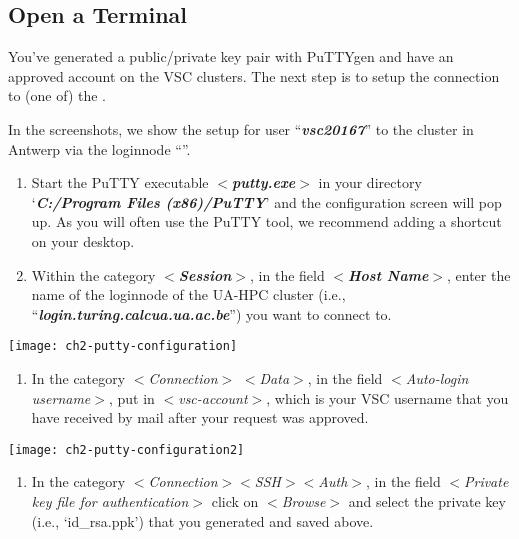   \subsection{Open a Terminal}
  \label{sec:windows-open-a-terminal}

  You've generated a public/private key pair with PuTTYgen and have an approved
  account on the VSC clusters.  The next step is to setup the connection to (one
  of) the \hpc.

  In the screenshots, we show the setup for user ``\textbf{\textit{vsc20167}}''
  to the \hpc cluster in Antwerp via the loginnode
  ``\textbf{\textit{\loginnode}}''.

  \begin{enumerate}
    \item  Start the PuTTY executable $<$\textbf{\textit{putty.exe}}$>$ in your
      directory `\textbf{\textit{C:/Program Files (x86)/PuTTY}}' and the
      configuration screen will pop up. As you will often use the PuTTY tool,
      we recommend adding a shortcut on your desktop.
    \item  Within the category $<$\textbf{\textit{Session}}$>$, in the field
      $<$\textbf{\textit{Host Name}}$>$, enter the name of the loginnode of the
      UA-HPC cluster (i.e., ``\textbf{\textit{login.turing.calcua.ua.ac.be}}'')
      you want to connect to.
  \end{enumerate}

  \texttt{[image: ch2-putty-configuration]}

  \begin{enumerate}
    \item  In the category $<$\textit{Connection}$>$ $<$\textit{Data}$>$, in
      the field $<$\textit{Auto-login username}$>$, put in
      $<$\textit{vsc-account}$>$, which is your VSC username that you have
      received by mail after your request was approved.
  \end{enumerate}

  \texttt{[image: ch2-putty-configuration2]}

  \begin{enumerate}
    \item  In the category $<$\textit{Connection$>$$<$SSH$>$$<$Auth$>$}, in the
      field $<$\textit{Private key file for authentication}$>$ click on
      $<$\textit{Browse}$>$ and select the private key (i.e., `id\_rsa.ppk')
      that you generated and saved above.
  \end{enumerate}

